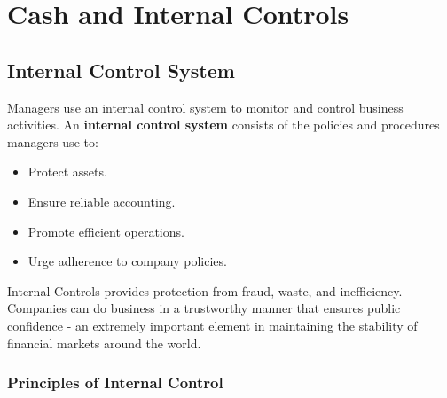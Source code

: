 \documentclass[../main.tex]{subfiles}
\begin{document}
	\section{Cash and Internal Controls}
	
	\subsection{Internal Control System}
	
	Managers use an internal control system to monitor and control business 
	activities.  An \textbf{internal control system} consists of the policies 
	and procedures managers use to: 
	\begin{itemize}[noitemsep]
		\item Protect assets.
		\item Ensure reliable accounting.
		\item Promote efficient operations.
		\item Urge adherence to company policies.
	\end{itemize}
	
	Internal Controls provides protection from fraud, waste, and inefficiency.
	Companies can do business in a trustworthy manner that ensures public 
	confidence - an extremely important element in maintaining the stability of 
	financial markets around the world.
	
	\subsubsection{Principles of Internal Control}
	
\end{document}
